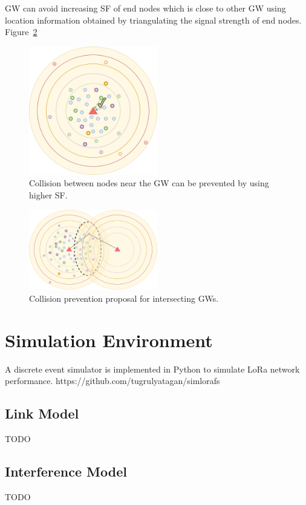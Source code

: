 \documentclass[conference]{IEEEtran}
\begin{document}
\par GW can avoid increasing SF of end nodes which is close to other GW using location information obtained by triangulating the signal strength of end nodes. Figure~\ref{fig:proposal_multi_gw}

\begin{figure}
\centering
\includegraphics[width=0.5\textwidth]{lora2-1}
\caption{Collision between nodes near the GW can be prevented by using higher SF.}
\label{fig:proposal_single_gw}
\end{figure}

\begin{figure}
\centering
\includegraphics[width=0.5\textwidth]{lora3-1}
\caption{Collision prevention proposal for intersecting GWs.}
\label{fig:proposal_multi_gw}
\end{figure}


\section{Simulation Environment}
A discrete event simulator is implemented in Python to simulate LoRa network performance. 
https://github.com/tugrulyatagan/simlorafs

\subsection{Link Model}
TODO

\subsection{Interference Model}
TODO
\end{document}
